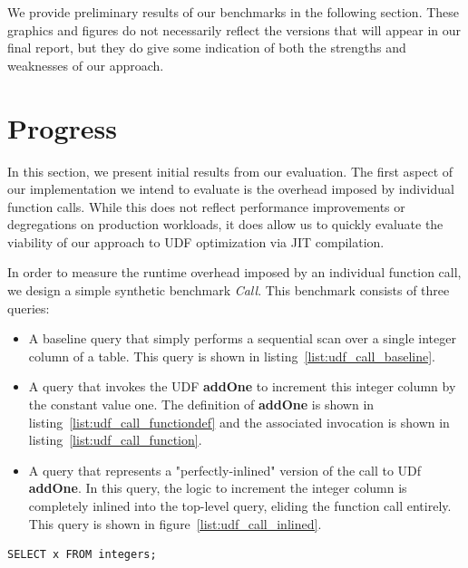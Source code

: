 \documentclass{vldb}
\newcommand{\dbCode}[1]{{\sffamily\small \textbf{#1}}\xspace}
\begin{document}
We provide preliminary results of our benchmarks in the following section. These graphics and figures do not necessarily reflect the versions that will appear in our final report, but they do give some indication of both the strengths and weaknesses of our approach.


\section{Progress}

In this section, we present initial results from our evaluation. The first aspect of our implementation we intend to evaluate is the overhead imposed by individual function calls. While this does not reflect performance improvements or degregations on production workloads, it does allow us to quickly evaluate the viability of our approach to UDF optimization via JIT compilation.

In order to measure the runtime overhead imposed by an individual function call, we design a simple synthetic benchmark \textit{Call}. This benchmark consists of three queries:

\begin{itemize}
    \item A baseline query that simply performs a sequential scan over a single integer column of a table. This query is shown in listing~\ref{list:udf_call_baseline}. 
    \item A query that invokes the UDF \dbCode{addOne} to increment this integer column by the constant value one. The definition of \dbCode{addOne} is shown in listing~\ref{list:udf_call_functiondef} and the associated invocation is shown in listing~\ref{list:udf_call_function}.
    \item A query that represents a "perfectly-inlined" version of the call to UDf \dbCode{addOne}. In this query, the logic to increment the integer column is completely inlined into the top-level query, eliding the function call entirely. This query is shown in figure~\ref{list:udf_call_inlined}.
\end{itemize}

\begin{listing}
    \begin{verbatim}
SELECT x FROM integers;
    \end{verbatim}
    \caption{The baseline query for evaluating the overhead of a UDF call.}
    \label{list:udf_call_baseline}
\end{listing}
\end{document}
